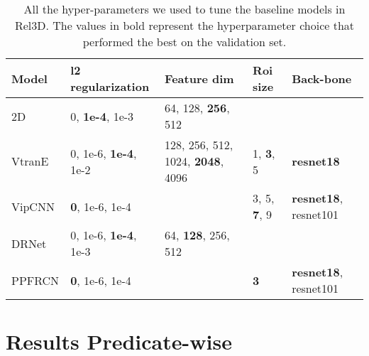 \documentclass{article}
\begin{document}
\begin{longtable}{lllll}
\caption{All the hyper-parameters we used to tune the baseline models in Rel3D. The values in bold represent the hyperparameter choice that performed the best on the validation set.} \\
\toprule
Model  & l2 regularization   & Feature dim                     & Roi size   & Back-bone           \\ \midrule
2D     & 0, \textbf{1e-4}, 1e-3       & 64, 128, \textbf{256}, 512               &            &                     \\ 
VtranE & 0, 1e-6, \textbf{1e-4}, 1e-2       & 128, 256, 512, 1024, \textbf{2048}, 4096 &   1, \textbf{3}, 5         & \textbf{resnet18}            \\ 
VipCNN & \textbf{0}, 1e-6, 1e-4       &                                 & 3, 5, \textbf{7}, 9 & \textbf{resnet18}, resnet101 \\ 
DRNet  & 0, 1e-6, \textbf{1e-4}, 1e-3 & 64, \textbf{128}, 256, 512               &            &                     \\
PPFRCN & \textbf{0}, 1e-6, 1e-4       &                                 &    \textbf{3}       & \textbf{resnet18}, resnet101 \\ \bottomrule
\end{longtable}


\section{Results Predicate-wise}
\end{document}
